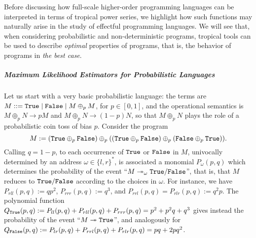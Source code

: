 
Before discussing how full-scale higher-order programming languages can be interpreted in terms of tropical power series, we highlight how such functions may naturally arise in the study of effectful programming languages.
We will see that, when considering probabilistic and non-deterministic programs, tropical tools can be used to describe \emph{optimal} properties of programs, that is, the behavior of programs in \emph{the best case}. 




\subparagraph*{Maximum Likelihood Estimators for Probabilistic Languages}

%



Let us start with a very basic probabilistic language:
the terms are $M::= \mathtt{True} \mid \mathtt{False} \mid M\oplus_p M$, for $p\in[0,1]$, and the operational semantics is $M\oplus_p N\to pM$ and $M\oplus_p N \to (1-p)N$, so that $M\oplus_p N$ plays the role of a probabilistic coin toss of bias $p$.
Consider the program
$$
 M:=(\mathtt{True} \oplus_p\mathtt{False})\oplus_p((\mathtt{True}\oplus_p\mathtt{False})\oplus_p(\mathtt{False}\oplus_p\mathtt{True})).
 $$
 Calling $q=1-p$, to each occurrence of $\mathtt{True}$ or $\mathtt{False}$ in $M$, univocally determined by an address
$\omega\in \{l,r\}^{*}$, is associated a monomial $P_{\omega}(p,q)$ which determines the probability of the event ``$M\twoheadrightarrow_{\omega} \mathtt{True}/\mathtt{False}$'', that is, that $M$ reduces to $\mathtt{True}/\mathtt{False}$ according to the choices in $\omega$.
 For instance, we have
$P_{rll}(p,q):=qp^2$,
$P_{rrr}(p,q):=q^3$, and 
$P_{rrl}(p,q)=P_{rlr}(p,q):=q^2p$.
The polynomial function $Q_{\mathtt{True}}(p,q):=P_{ll}(p,q)+P_{rll}(p,q)+P_{rrr}(p,q)=p^2+p^2q+q^3$ gives instead the probability of the event ``$M\twoheadrightarrow \mathtt{True}$'', and analogously for $Q_{\mathtt{False}}(p,q):=P_{lr}(p,q)+P_{rrl}(p,q)+P_{rlr}(p,q)=pq+2pq^2$.


